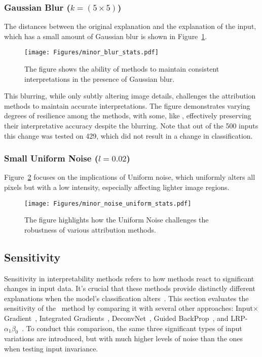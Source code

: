 \subsubsection{Gaussian Blur ($k = (5 \times 5)$)} The distances between the original explanation and the explanation of the input, which has a small amount of Gaussian blur is shown in Figure~\ref{Fig:blur}. 
\begin{figure}[ht!]
	\begin{center}
		\texttt{[image: Figures/minor\_blur\_stats.pdf]}
	\end{center}
	\caption{The figure shows the ability of methods to maintain consistent interpretations in the presence of Gaussian blur.}
	\label{Fig:blur}
\end{figure} 
This blurring, while only subtly altering image details, challenges the attribution methods to maintain accurate interpretations. The figure demonstrates varying degrees of resilience among the methods, with some, like \CTC, effectively preserving their interpretative accuracy despite the blurring. Note that out of the 500 inputs this change was tested on 429, which did not result in a change in classification.
\subsubsection{Small Uniform Noise ($l = 0.02$)}
Figure~\ref{Fig:uniform} focuses on the implications of Uniform noise, which uniformly alters all pixels but with a low intensity, especially affecting lighter image regions. 
\begin{figure}[ht!]
	\begin{center}
		\texttt{[image: Figures/minor\_noise\_uniform\_stats.pdf]}
	\end{center}
	\caption{The figure highlights how the Uniform Noise challenges the robustness of various attribution methods.}
	\label{Fig:uniform}
\end{figure} 
\newpage
\subsection{Sensitivity}
Sensitivity in interpretability methods refers to how methods react to significant changes in input data. It's crucial that these methods provide distinctly different explanations when the model's classification alters~\cite{NielsenDRRB22}. This section evaluates the sensitivity of the \CTC\ method by comparing it with several other approaches: Input$\times$Gradient~\cite{SimonyanVZ13}, Integrated Gradients~\cite{SundararajanTY17}, DeconvNet~\cite{ZeilerKTF10}, Guided BackProp~\cite{SpringenbergDBR14}, and LRP-$\alpha_1\beta_0$~\cite{bach2015pixel}. To conduct this comparison, the same three significant types of input variations are introduced, but with much higher levels of noise than the ones when testing input invariance.

